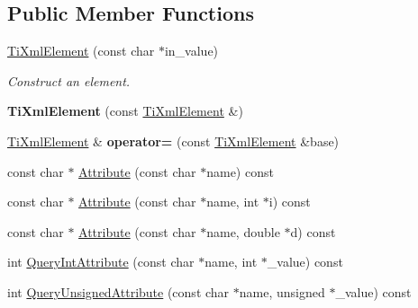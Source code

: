 \subsection*{Public Member Functions}
\begin{DoxyCompactItemize}
\item 
\hyperlink{classTiXmlElement_a01bc3ab372d35da08efcbbe65ad90c60}{Ti\+Xml\+Element} (const char $\ast$in\+\_\+value)\hypertarget{classTiXmlElement_a01bc3ab372d35da08efcbbe65ad90c60}{}\label{classTiXmlElement_a01bc3ab372d35da08efcbbe65ad90c60}

\begin{DoxyCompactList}\small\item\em Construct an element. \end{DoxyCompactList}\item 
{\bfseries Ti\+Xml\+Element} (const \hyperlink{classTiXmlElement}{Ti\+Xml\+Element} \&)\hypertarget{classTiXmlElement_a1ca4465f3c2eac6a60e641cd7f1d9f7e}{}\label{classTiXmlElement_a1ca4465f3c2eac6a60e641cd7f1d9f7e}

\item 
\hyperlink{classTiXmlElement}{Ti\+Xml\+Element} \& {\bfseries operator=} (const \hyperlink{classTiXmlElement}{Ti\+Xml\+Element} \&base)\hypertarget{classTiXmlElement_ad58d300f4cfc0016ffa6861ebb718a0b}{}\label{classTiXmlElement_ad58d300f4cfc0016ffa6861ebb718a0b}

\item 
const char $\ast$ \hyperlink{classTiXmlElement_ac1e4691e9375ba4e665dce7e46a50a9c}{Attribute} (const char $\ast$name) const 
\item 
const char $\ast$ \hyperlink{classTiXmlElement_aa9192e80567b5042dbded80b78c44339}{Attribute} (const char $\ast$name, int $\ast$i) const 
\item 
const char $\ast$ \hyperlink{classTiXmlElement_aec4f727f8aa49b51248d80125d173136}{Attribute} (const char $\ast$name, double $\ast$d) const 
\item 
int \hyperlink{classTiXmlElement_aea0bfe471380f281c5945770ddbf52b9}{Query\+Int\+Attribute} (const char $\ast$name, int $\ast$\+\_\+value) const 
\item 
int \hyperlink{classTiXmlElement_ae48df644f890ab86fa19839ac401f00d}{Query\+Unsigned\+Attribute} (const char $\ast$name, unsigned $\ast$\+\_\+value) const \hypertarget{classTiXmlElement_ae48df644f890ab86fa19839ac401f00d}{}\label{classTiXmlElement_ae48df644f890ab86fa19839ac401f00d}


\end{DoxyCompactItemize}

